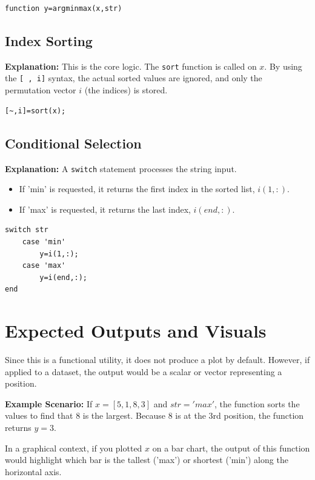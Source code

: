 \begin{lstlisting}
function y=argminmax(x,str)
\end{lstlisting}

\subsection{Index Sorting}
\textbf{Explanation:} This is the core logic. The \texttt{sort} function is called on $x$. By using the \texttt{[~, i]} syntax, the actual sorted values are ignored, and only the permutation vector $i$ (the indices) is stored.

\begin{lstlisting}
[~,i]=sort(x);
\end{lstlisting}

\subsection{Conditional Selection}
\textbf{Explanation:} A \texttt{switch} statement processes the string input. 
\begin{itemize}
    \item If 'min' is requested, it returns the first index in the sorted list, $i(1,:)$.
    \item If 'max' is requested, it returns the last index, $i(end,:)$.
\end{itemize}

\begin{lstlisting}
switch str
    case 'min'
        y=i(1,:);
    case 'max'
        y=i(end,:);
end
\end{lstlisting}

\section{Expected Outputs and Visuals}
Since this is a functional utility, it does not produce a plot by default. However, if applied to a dataset, the output would be a scalar or vector representing a position.

\textbf{Example Scenario:}
If $x = [5, 1, 8, 3]$ and $str = 'max'$, the function sorts the values to find that $8$ is the largest. Because $8$ is at the 3rd position, the function returns $y = 3$. 

In a graphical context, if you plotted $x$ on a bar chart, the output of this function would highlight which bar is the tallest ('max') or shortest ('min') along the horizontal axis.
